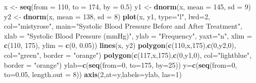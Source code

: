 \documentclass[]{book}
\newenvironment{Shaded}{\begin{snugshade}}{\end{snugshade}}
\newcommand{\KeywordTok}[1]{\textcolor[rgb]{0.13,0.29,0.53}{\textbf{#1}}}
\newcommand{\DataTypeTok}[1]{\textcolor[rgb]{0.13,0.29,0.53}{#1}}
\newcommand{\DecValTok}[1]{\textcolor[rgb]{0.00,0.00,0.81}{#1}}
\newcommand{\FloatTok}[1]{\textcolor[rgb]{0.00,0.00,0.81}{#1}}
\newcommand{\StringTok}[1]{\textcolor[rgb]{0.31,0.60,0.02}{#1}}
\newcommand{\NormalTok}[1]{#1}
\begin{document}
\begin{Shaded}
\begin{Highlighting}[]
\NormalTok{x <-}\StringTok{ }\KeywordTok{seq}\NormalTok{(}\DataTypeTok{from =} \DecValTok{110}\NormalTok{, }\DataTypeTok{to =} \DecValTok{174}\NormalTok{, }\DataTypeTok{by =} \FloatTok{0.5}\NormalTok{)}
\NormalTok{y1 <-}\StringTok{ }\KeywordTok{dnorm}\NormalTok{(x, }\DataTypeTok{mean =} \DecValTok{145}\NormalTok{, }\DataTypeTok{sd =} \DecValTok{9}\NormalTok{)}
\NormalTok{y2 <-}\StringTok{ }\KeywordTok{dnorm}\NormalTok{(x, }\DataTypeTok{mean =} \DecValTok{138}\NormalTok{, }\DataTypeTok{sd =} \DecValTok{8}\NormalTok{)}
\KeywordTok{plot}\NormalTok{(x, y1, }\DataTypeTok{type=}\StringTok{"l"}\NormalTok{, }\DataTypeTok{lwd=}\DecValTok{2}\NormalTok{, }\DataTypeTok{col=}\StringTok{"mistyrose"}\NormalTok{,}
     \DataTypeTok{main=}\StringTok{"Systolic Blood Pressure Before and After Treatment"}\NormalTok{,}
     \DataTypeTok{xlab =} \StringTok{"Systolic Blood Pressure (mmHg)"}\NormalTok{,}
     \DataTypeTok{ylab =} \StringTok{"Frequency"}\NormalTok{, }\DataTypeTok{yaxt=}\StringTok{"n"}\NormalTok{,}
     \DataTypeTok{xlim =} \KeywordTok{c}\NormalTok{(}\DecValTok{110}\NormalTok{, }\DecValTok{175}\NormalTok{), }\DataTypeTok{ylim =} \KeywordTok{c}\NormalTok{(}\DecValTok{0}\NormalTok{, }\FloatTok{0.05}\NormalTok{))}
\KeywordTok{lines}\NormalTok{(x, y2)}
\KeywordTok{polygon}\NormalTok{(}\KeywordTok{c}\NormalTok{(}\DecValTok{110}\NormalTok{,x,}\DecValTok{175}\NormalTok{),}\KeywordTok{c}\NormalTok{(}\DecValTok{0}\NormalTok{,y2,}\DecValTok{0}\NormalTok{), }\DataTypeTok{col=}\StringTok{"green"}\NormalTok{,}
     \DataTypeTok{border =} \StringTok{"orange"}\NormalTok{)}
\KeywordTok{polygon}\NormalTok{(}\KeywordTok{c}\NormalTok{(}\DecValTok{117}\NormalTok{,x,}\DecValTok{175}\NormalTok{),}\KeywordTok{c}\NormalTok{(}\DecValTok{0}\NormalTok{,y1,}\DecValTok{0}\NormalTok{), }\DataTypeTok{col=}\StringTok{"lightblue"}\NormalTok{,}
     \DataTypeTok{border =} \StringTok{"orange"}\NormalTok{)}
\NormalTok{ylab=}\KeywordTok{c}\NormalTok{(}\KeywordTok{seq}\NormalTok{(}\DataTypeTok{from=}\DecValTok{0}\NormalTok{, }\DataTypeTok{to=}\DecValTok{175}\NormalTok{, }\DataTypeTok{by=}\DecValTok{25}\NormalTok{))}
\NormalTok{y=}\KeywordTok{c}\NormalTok{(}\KeywordTok{seq}\NormalTok{(}\DataTypeTok{from=}\DecValTok{0}\NormalTok{, }\DataTypeTok{to=}\FloatTok{0.05}\NormalTok{, }\DataTypeTok{length.out =} \DecValTok{8}\NormalTok{))}
\KeywordTok{axis}\NormalTok{(}\DecValTok{2}\NormalTok{,}\DataTypeTok{at=}\NormalTok{y,}\DataTypeTok{labels=}\NormalTok{ylab, }\DataTypeTok{las=}\DecValTok{1}\NormalTok{)}

\end{Highlighting}
\end{Shaded}
\end{document}
